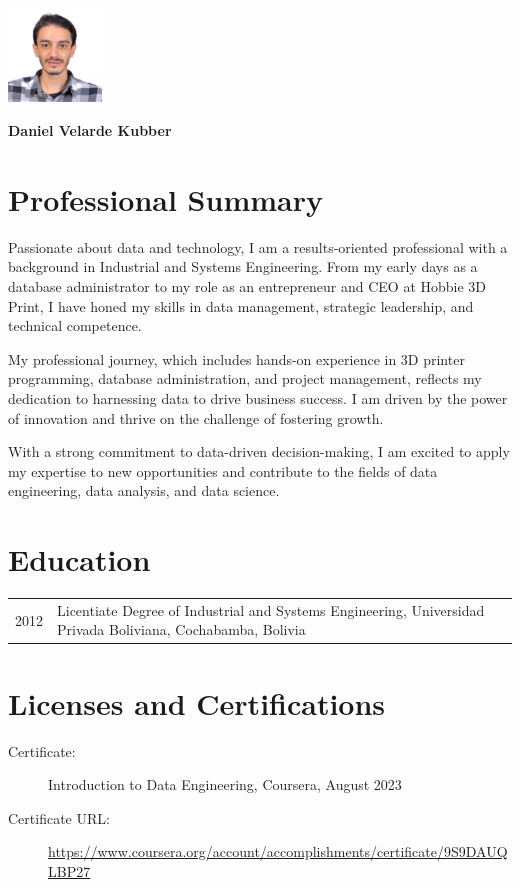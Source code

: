 \documentclass[a4paper,10pt]{article}
\begin{document}
\begin{minipage}[t]{0.7\textwidth}
\end{minipage}
\hfill
\begin{minipage}[t]{0.3\textwidth}
  \includegraphics[width=2.5cm]{photocv.jpeg}
\end{minipage}

\begin{center}
\textbf{\LARGE Daniel Velarde Kubber}
\end{center}

\section*{Professional Summary}
Passionate about data and technology, I am a results-oriented professional with a background in Industrial and Systems Engineering. From my early days as a database administrator to my role as an entrepreneur and CEO at Hobbie 3D Print, I have honed my skills in data management, strategic leadership, and technical competence.

My professional journey, which includes hands-on experience in 3D printer programming, database administration, and project management, reflects my dedication to harnessing data to drive business success. I am driven by the power of innovation and thrive on the challenge of fostering growth.

With a strong commitment to data-driven decision-making, I am excited to apply my expertise to new opportunities and contribute to the fields of data engineering, data analysis, and data science.

\section*{Education}
\begin{tabular}{p{3cm}p{12cm}}
    2012 & Licentiate Degree of Industrial and Systems Engineering, Universidad Privada Boliviana, Cochabamba, Bolivia \\
\end{tabular}

\section*{Licenses and Certifications}
\begin{description}
    \item[Certificate:] Introduction to Data Engineering, Coursera, August 2023
    \item[Certificate URL:] \url{https://www.coursera.org/account/accomplishments/certificate/9S9DAUQLBP27}
\end{description}
\end{document}
